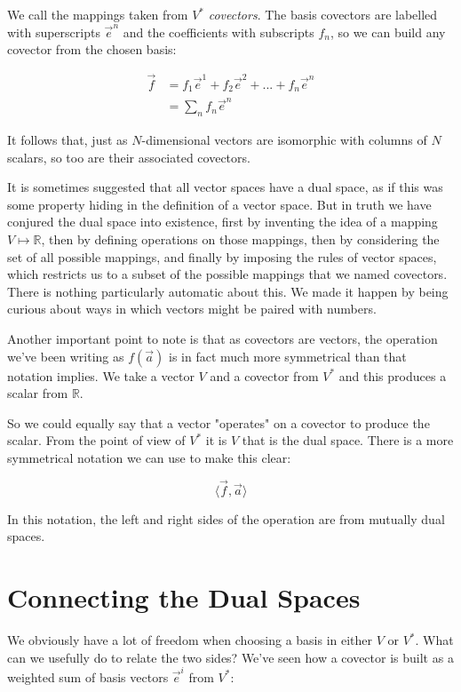 We call the mappings taken from $V^*$ \textit{covectors}. The basis covectors are labelled with superscripts $\vec{e}^n$ and the coefficients with subscripts $f_n$, so we can build any covector from the chosen basis:

\begin{equation}
    \begin{split}
    \vec{f} &= f_1 \vec{e}^1 + f_2 \vec{e}^2 + ... + f_n \vec{e}^n \\
            &= \sum_n f_n \vec{e}^n
    \end{split}
\end{equation}

It follows that, just as $N$-dimensional vectors are isomorphic with columns of $N$ scalars, so too are their associated covectors.

It is sometimes suggested that all vector spaces have a dual space, as if this was some property hiding in the definition of a vector space. But in truth we have conjured the dual space into existence, first by inventing the idea of a mapping $V \mapsto \mathbb{R}$, then by defining operations on those mappings, then by considering the set of all possible mappings, and finally by imposing the rules of vector spaces, which restricts us to a subset of the possible mappings that we named covectors. There is nothing particularly automatic about this. We made it happen by being curious about ways in which vectors might be paired with numbers.

Another important point to note is that as covectors are vectors, the operation we've been writing as $f(\vec{a})$ is in fact much more symmetrical than that notation implies. We take a vector $V$ and a covector from $V^*$ and this produces a scalar from $\mathbb{R}$. 

So we could equally say that a vector "operates" on a covector to produce the scalar. From the point of view of $V^*$ it is $V$ that is the dual space. There is a more symmetrical notation we can use to make this clear:

$$\langle \vec{f},\vec{a}\rangle$$

In this notation, the left and right sides of the operation are from mutually dual spaces.

\section{Connecting the Dual Spaces}

We obviously have a lot of freedom when choosing a basis in either $V$ or $V^*$. What can we usefully do to relate the two sides? We've seen how a covector is built as a weighted sum of basis vectors $\vec{e}^i$ from $V^*$:

